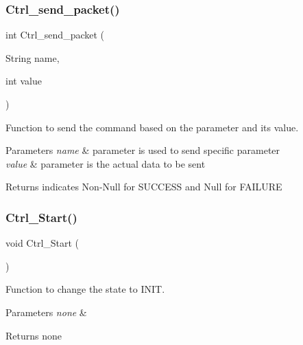 \subsubsection{\texorpdfstring{Ctrl\+\_\+send\+\_\+packet()}{Ctrl\_send\_packet()}\hspace{0.1cm}{\footnotesize\ttfamily [2/2]}}
{\footnotesize\ttfamily int Ctrl\+\_\+send\+\_\+packet (\begin{DoxyParamCaption}\item[{String}]{name,  }\item[{int}]{value }\end{DoxyParamCaption})}



Function to send the command based on the parameter and its value. 


\begin{DoxyParams}{Parameters}
{\em name} & parameter is used to send specific parameter\\
\hline
{\em value} & parameter is the actual data to be sent\\
\hline
\end{DoxyParams}
\begin{DoxyReturn}{Returns}
indicates Non-\/\+Null for S\+U\+C\+C\+E\+SS and Null for F\+A\+I\+L\+U\+RE 
\end{DoxyReturn}
\mbox{\label{group___state_control_module_ga62b8b9b48c52c1774d555e94b672856f}} 
\subsubsection{\texorpdfstring{Ctrl\+\_\+\+Start()}{Ctrl\_Start()}}
{\footnotesize\ttfamily void Ctrl\+\_\+\+Start (\begin{DoxyParamCaption}{ }\end{DoxyParamCaption})}



Function to change the state to I\+N\+IT. 


\begin{DoxyParams}{Parameters}
{\em none} & \\
\hline
\end{DoxyParams}
\begin{DoxyReturn}{Returns}
none 
\end{DoxyReturn}
\mbox{\label{group___state_control_module_ga0926cce894ccf2232698c5be4b94e09e}} 

